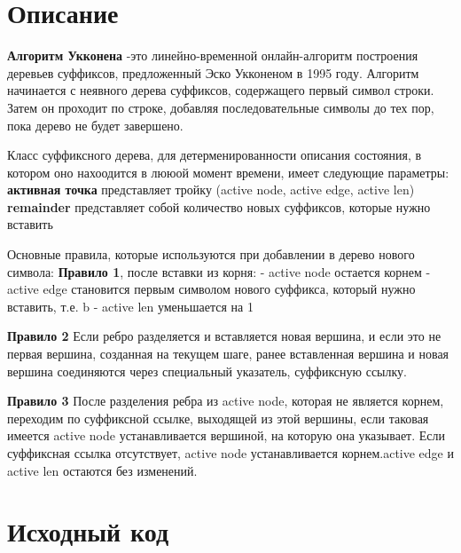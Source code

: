 \section{Описание}

\textbf{Алгоритм Укконена} -это линейно-временной онлайн-алгоритм построения деревьев суффиксов, предложенный Эско Укконеном в 1995 году. Алгоритм начинается с неявного дерева суффиксов, содержащего первый символ строки. Затем он проходит по строке, добавляя последовательные символы до тех пор, пока дерево не будет завершено.

Класс суффиксного дерева, для детерменированности описания состояния, в котором оно нахоодится в лююой момент времени, имеет следующие параметры:\newline
\textbf{активная точка} представляет тройку (active node, active edge, active len)\newline
\textbf{remainder} представляет собой количество новых суффиксов, которые нужно вставить\newline

Основные правила, которые используются при добавлении в дерево нового символа:
\textbf{Правило 1}, после вставки из корня:\newline
- active node остается корнем\newline
- active edge становится первым символом нового суффикса, который нужно вставить, т.е. b\newline
- active len уменьшается на 1\newline

\textbf{Правило 2}\newline
Если ребро разделяется и вставляется новая вершина, и если это не первая вершина, созданная на текущем шаге, ранее вставленная вершина и новая вершина соединяются через специальный указатель, суффиксную ссылку.\newline

\textbf{Правило 3}\newline
После разделения ребра из active node, которая не является корнем, переходим по суффиксной ссылке, выходящей из этой вершины, если таковая имеется active node устанавливается вершиной, на которую она указывает. Если суффиксная ссылка отсутствует, active node устанавливается корнем.active edge и active len остаются без изменений.\newline

\pagebreak

\section{Исходный код}

